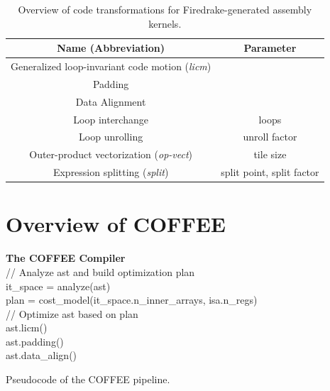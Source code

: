 \documentclass[conference]{IEEEtran}
\begin{document}
\begin{table}[h]
\begin{center}
\begin{tabulary}{1.0\columnwidth}{|C|C|}
\hline
Name (Abbreviation) & Parameter \\\hline\hline
Generalized loop-invariant code motion (\emph{licm}) &   \\ \hline
Padding &  \\ \hline
Data Alignment & \\ \hline
Loop interchange      & loops  \\ \hline
Loop unrolling  & unroll factor \\ \hline
Outer-product vectorization (\emph{op-vect}) & tile size \\ \hline
Expression splitting (\emph{split}) & split point, split factor \\ \hline
\end{tabulary}
\end{center}
\caption{Overview of code transformations for Firedrake-generated assembly kernels.}
\label{table:code-transformations}
\end{table}


\section{Overview of COFFEE}
\label{sec:pyop2-compiler}

\begin{algorithm}[t]
\label{algo:PyOP2Compiler}
  \textbf{The COFFEE Compiler}\\
// Analyze ast and build optimization plan \\
it\_space = analyze(ast) \\
plan = cost\_model(it\_space.n\_inner\_arrays, isa.n\_regs) \\
// Optimize ast based on plan \\
ast.licm() \\
ast.padding() \\
ast.data\_align() \\
\caption{Pseudocode of the COFFEE pipeline.}
\end{algorithm}
\end{document}
